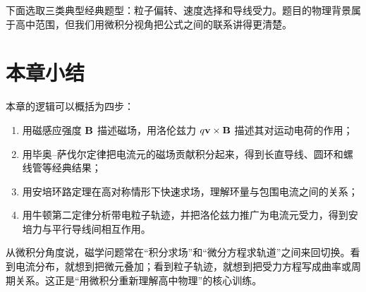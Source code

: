 下面选取三类典型经典题型：粒子偏转、速度选择和导线受力。题目的物理背景属于高中范围，但我们用微积分视角把公式之间的联系讲得更清楚。

\section*{本章小结}

本章的逻辑可以概括为四步：
\begin{enumerate}
  \item 用磁感应强度 $\vb{B}$ 描述磁场，用洛伦兹力 $q\vb{v}\times\vb{B}$ 描述其对运动电荷的作用；
  \item 用毕奥--萨伐尔定律把电流元的磁场贡献积分起来，得到长直导线、圆环和螺线管等经典结果；
  \item 用安培环路定理在高对称情形下快速求场，理解环量与包围电流之间的关系；
  \item 用牛顿第二定律分析带电粒子轨迹，并把洛伦兹力推广为电流元受力，得到安培力与平行导线间相互作用。
\end{enumerate}

从微积分角度说，磁学问题常在“积分求场”和“微分方程求轨道”之间来回切换。看到电流分布，就想到把微元叠加；看到粒子轨迹，就想到把受力方程写成曲率或周期关系。这正是“用微积分重新理解高中物理”的核心训练。

